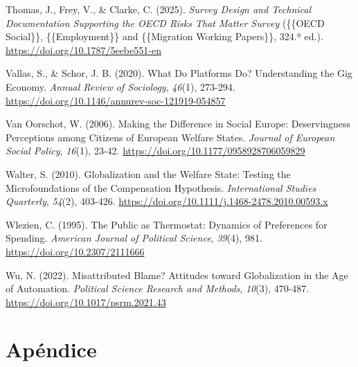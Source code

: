 \documentclass[
  spanish,
  12pt,
]{article}
\newlength{\cslhangindent}
\newenvironment{CSLReferences}[2] %
 {\begin{list}{}{%
  \setlength{\itemindent}{0pt}
  \setlength{\leftmargin}{0pt}
  \setlength{\parsep}{0pt}
  \ifodd #1
   \setlength{\leftmargin}{\cslhangindent}
   \setlength{\itemindent}{-1\cslhangindent}
  \fi
  \setlength{\itemsep}{#2\baselineskip}}}
 {\end{list}}
\begin{document}
\begin{CSLReferences}{1}{0}
Thomas, J., Frey, V., \& Clarke, C. (2025). \emph{Survey Design and
Technical Documentation Supporting the {OECD Risks} That {Matter
Survey}} (\{\{OECD Social\}\}, \{\{Employment\}\} and \{\{Migration
Working Papers\}\}, 324.ª ed.).
\url{https://doi.org/10.1787/5eebe551-en}

Vallas, S., \& Schor, J. B. (2020). What {Do Platforms Do}?
{Understanding} the {Gig Economy}. \emph{Annual Review of Sociology},
\emph{46}(1), 273-294.
\url{https://doi.org/10.1146/annurev-soc-121919-054857}

Van Oorschot, W. (2006). Making the Difference in Social {Europe}:
{Deservingness} Perceptions among Citizens of {European} Welfare States.
\emph{Journal of European Social Policy}, \emph{16}(1), 23-42.
\url{https://doi.org/10.1177/0958928706059829}

Walter, S. (2010). Globalization and the Welfare State: {Testing} the
Microfoundations of the Compensation Hypothesis. \emph{International
Studies Quarterly}, \emph{54}(2), 403-426.
\url{https://doi.org/10.1111/j.1468-2478.2010.00593.x}

Wlezien, C. (1995). The {Public} as {Thermostat}: {Dynamics} of
{Preferences} for {Spending}. \emph{American Journal of Political
Science}, \emph{39}(4), 981. \url{https://doi.org/10.2307/2111666}

Wu, N. (2022). Misattributed Blame? {Attitudes} toward Globalization in
the Age of Automation. \emph{Political Science Research and Methods},
\emph{10}(3), 470-487. \url{https://doi.org/10.1017/psrm.2021.43}

\end{CSLReferences}

\section{Apéndice}\label{apuxe9ndice}
\end{document}
